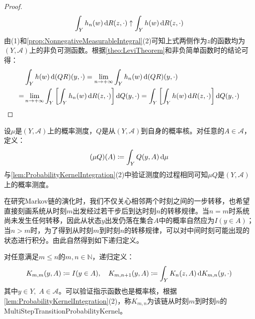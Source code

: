 \begin{proof}
	\begin{equation*}
		\int_{Y}h_n(w)\mathop{}\!\mathrm{d} R(z,\cdot)\uparrow\int_{Y}h(w)\mathop{}\!\mathrm{d} R(z,\cdot)
	\end{equation*}
	由(1)和\cref{prop:NonnegativeMeasurableIntegral}(2)可知上式两侧作为$z$的函数均为$(Y,\mathscr{A})$上的非负可测函数。根据\cref{theo:LeviTheorem}和非负简单函数时的结论可得：
	\begin{align*}
		&\int_{Y}h(w)\mathop{}\!\mathrm{d}(QR)(y,\cdot)=\lim_{n\to+\infty}\int_{Y}h_n(w)\mathop{}\!\mathrm{d}(QR)(y,\cdot) \\
		=&\lim_{n\to+\infty}\int_{Y}\left[\int_{Y}h_n(w)\mathop{}\!\mathrm{d} R(z,\cdot)\right]\mathop{}\!\mathrm{d} Q(y,\cdot)=\int_{Y}\left[\int_{Y}h(w)\mathop{}\!\mathrm{d} R(z,\cdot)\right]\mathop{}\!\mathrm{d} Q(y,\cdot)\qedhere
	\end{align*}
\end{proof}
\begin{definition}
	设$\mu$是$(Y,\mathscr{A})$上的概率测度，$Q$是从$(Y,\mathscr{A})$到自身的概率核。对任意的$A\in\mathscr{A}$，定义：
	\begin{equation*}
		(\mu Q)(A)\coloneq\int_{Y}Q(y,A)\mathop{}\!\mathrm{d}\mu
	\end{equation*}
	与\cref{lem:ProbabilityKernelIntegration}(2)中验证测度的过程相同可知$\mu Q$是$(Y,\mathscr{A})$上的概率测度。
\end{definition}
在研究Markov链的演化时，我们不仅关心相邻两个时刻之间的一步转移，也希望直接刻画系统从时刻$m$出发经过若干步后到达时刻$n$的转移规律。当$n=m$时系统尚未发生任何转移，因此从状态$y$出发仍落在集合$A$中的概率自然应为$I(y\in A)$；当$n>m$时，为了得到从时刻$m$到时刻$n$的转移规律，可以对中间时刻可能出现的状态进行积分。由此自然得到如下递归定义。
\begin{definition}
	对任意满足$m\leqslant n$的$m,n\in\mathbb{N}$，递归定义：
	\begin{equation*}
		K_{m,m}(y,A)\coloneq I(y\in A),\quad K_{m,n+1}(y,A)\coloneq\int_{Y}K_n(z,A)\mathop{}\!\mathrm{d} K_{m,n}(y,\cdot)
	\end{equation*}
	其中$y\in Y,\;A\in\mathscr{A}$。可以验证指示函数也是概率核，根据\cref{lem:ProbabilityKernelIntegration}(2)，称$K_{m,n}$为该链从时刻$m$到时刻$n$的\gls{MultiStepTransitionProbabilityKernel}。
\end{definition}
